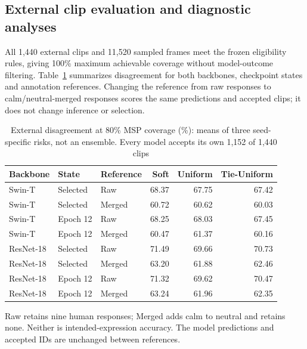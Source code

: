 \subsection{External clip evaluation and diagnostic analyses}

All 1,440 external clips and 11,520 sampled frames meet the frozen eligibility rules, giving 100\% maximum achievable coverage without model-outcome filtering. Table~\ref{tab:external} summarizes disagreement for both backbones, checkpoint states and annotation references. Changing the reference from raw responses to calm/neutral-merged responses scores the same predictions and accepted clips; it does not change inference or selection.

\begin{table}[t]
\caption{External disagreement at 80\% MSP coverage (\%): means of three seed-specific risks, not an ensemble. Every model accepts its own 1,152 of 1,440 clips}\label{tab:external}
\centering\small\begin{tabular}{lllrrr}\toprule
Backbone & State & Reference & Soft & Uniform & Tie-Uniform\\\midrule
Swin-T & Selected & Raw & 68.37 & 67.75 & 67.42\\
Swin-T & Selected & Merged & 60.72 & 60.62 & 60.03\\
Swin-T & Epoch 12 & Raw & 68.25 & 68.03 & 67.45\\
Swin-T & Epoch 12 & Merged & 60.47 & 61.37 & 60.16\\
ResNet-18 & Selected & Raw & 71.49 & 69.66 & 70.73\\
ResNet-18 & Selected & Merged & 63.20 & 61.88 & 62.46\\
ResNet-18 & Epoch 12 & Raw & 71.32 & 69.62 & 70.47\\
ResNet-18 & Epoch 12 & Merged & 63.24 & 61.96 & 62.35\\
\bottomrule\end{tabular}\par\smallskip
Raw retains nine human responses; Merged adds calm to neutral and retains none. Neither is intended-expression accuracy. The model predictions and accepted IDs are unchanged between references.\par
\end{table}

